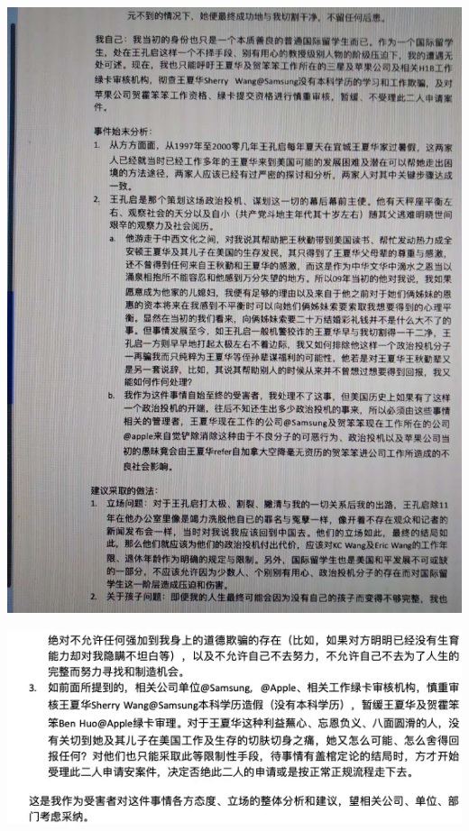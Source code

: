 \documentclass[9pt, b5paper]{article}
\begin{document}
\includegraphics[width=.9\linewidth]{./pic/4.jpg}

\includegraphics[width=.9\linewidth]{./pic/5.jpg}
\end{document}
